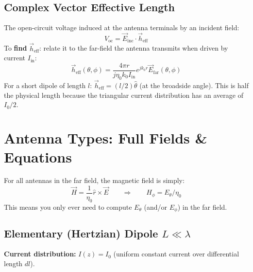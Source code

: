 \documentclass[10pt,letterpaper]{article}
\newcommand{\vE}{\vec{E}}
\newcommand{\vH}{\vec{H}}
\newcommand{\heff}{\vec{h}_{\mathrm{eff}}}
\newcommand{\rhat}{\hat{r}}
\begin{document}
\subsection{Complex Vector Effective Length}

\begin{tcolorbox}[formulabox, title={Effective Length $\heff$}]
The open-circuit voltage induced at the antenna terminals by an incident field:
\begin{equation}
  V_\mathrm{oc} = \vE_\mathrm{inc}\cdot\heff
\end{equation}
To \textbf{find} $\heff$: relate it to the far-field the antenna transmits when driven by current $I_\mathrm{in}$:
\begin{equation}
  \heff(\theta,\phi) = \frac{4\pi r}{j\eta_0 k_0 I_\mathrm{in}}e^{jk_0 r}\vE_\mathrm{far}(\theta,\phi)
\end{equation}
For a short dipole of length $l$: $\heff = (l/2)\hat{\theta}$ (at the broadside angle). This is half the physical length because the triangular current distribution has an average of $I_0/2$.
\end{tcolorbox}

\section{Antenna Types: Full Fields \& Equations}

\begin{tcolorbox}[keybox, title={Universal Far-Field Relation}]
For all antennas in the far field, the magnetic field is simply:
\begin{equation}
  \vH = \frac{1}{\eta_0}\rhat\times\vE \qquad \Rightarrow \qquad H_\phi = E_\theta/\eta_0
\end{equation}
This means you only ever need to compute $E_\theta$ (and/or $E_\phi$) in the far field.
\end{tcolorbox}

\subsection{Elementary (Hertzian) Dipole $L\ll\lambda$}

\textbf{Current distribution:} $I(z) = I_0$ (uniform constant current over differential length $dl$).
\end{document}

